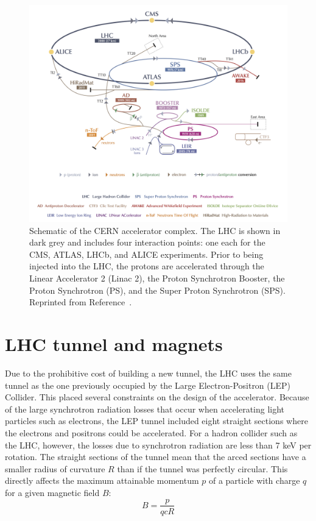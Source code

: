\begin{figure}[h!]
	\centering
	\includegraphics[width=\linewidth]{Figures/LHC/accelerator.jpg}
       \caption{Schematic of the CERN accelerator complex. The LHC is shown in dark grey and includes four interaction points: one each for the CMS, ATLAS, LHCb, and ALICE experiments. Prior to being injected into the LHC, the protons are accelerated through the Linear Accelerator 2 (Linac 2), the Proton Synchrotron Booster, the Proton Synchrotron (PS), and the Super Proton Synchrotron (SPS). Reprinted from Reference~\cite{CDS}.}
       \label{fig:accelerator}
\end{figure}

\section{LHC tunnel and magnets}
\label{sec:tunnel}

Due to the prohibitive cost of building a new tunnel, the LHC uses the same tunnel as the one previously occupied by the Large Electron-Positron (LEP) Collider. This placed several constraints on the design of the accelerator. Because of the large synchrotron radiation losses that occur when accelerating light particles such as electrons, the LEP tunnel included eight straight sections where the electrons and positrons could be accelerated. For a hadron collider such as the LHC, however, the losses due to synchrotron radiation are less than 7 keV per rotation. The straight sections of the tunnel mean that the arced sections have a smaller radius of curvature $R$ than if the tunnel was perfectly circular. This directly affects the maximum attainable momentum $p$ of a particle with charge $q$ for a given magnetic field $B$:
\begin{equation}
B = \frac{p}{qcR}
\end{equation}

